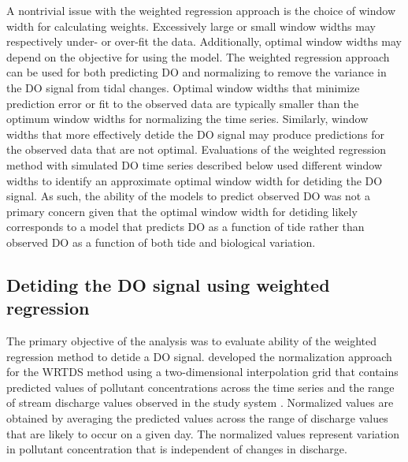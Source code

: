 \documentclass[letterpaper,12pt,oneside]{article}\usepackage[]{graphicx}\usepackage[]{color}
\begin{document}
A nontrivial issue with the weighted regression approach is the choice of window width for calculating weights.  Excessively large or small window widths may respectively under- or over-fit the data.  Additionally, optimal window widths may depend on the objective for using the model.  The weighted regression approach can be used for both predicting \ac{DO} and normalizing to remove the variance in the \ac{DO} signal from tidal changes.  Optimal window widths that minimize prediction error or fit to the observed data are typically smaller than the optimum window widths for normalizing the time series.  Similarly, window widths that more effectively detide the \ac{DO} signal may produce predictions for the observed data that are not optimal.  Evaluations of the weighted regression method with simulated \ac{DO} time series described below used different window widths to identify an approximate optimal window width for detiding the \ac{DO} signal.  As such, the ability of the models to predict observed \ac{DO} was not a primary concern given that the optimal window width for detiding likely corresponds to a model that predicts \ac{DO} as a function of tide rather than observed \ac{DO} as a function of both tide and biological variation.  

\subsection{Detiding the \ac{DO} signal using weighted regression}

The primary objective of the analysis was to evaluate ability of the weighted regression method to detide a \ac{DO} signal.  \citet{Hirsch10} developed the normalization approach for the \ac{WRTDS} method using a two-dimensional interpolation grid that contains predicted values of pollutant concentrations across the time series and the range of stream discharge values observed in the study system \citep{Hirsch10}.  Normalized values are obtained by averaging the predicted values across the range of discharge values that are likely to occur on a given day.  The normalized values represent variation in pollutant concentration that is independent of changes in discharge.  
\end{document}
